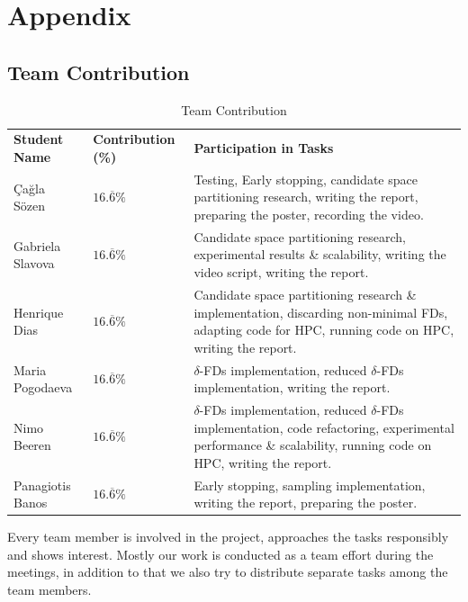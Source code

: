 \documentclass{article}
\begin{document}
\clearpage
\appendix
\section{Appendix}\label{appendix}
    \subsection{Team Contribution}
     
    \begin{table}[ht]
    \centering
        \begin{tabular}{|p{}|p{}|p{}|}
        \hline
        \textbf{Student Name} & \textbf{Contribution (\%)} & \textbf{Participation in Tasks} \\
        \Xhline{2\arrayrulewidth}
        
        Çağla Sözen & $16.\overline{6}\%$ & Testing, Early stopping, candidate space partitioning research,  writing the report, preparing the poster, recording the video.\\
        \hline
        
        Gabriela Slavova & $16.\overline{6}\%$ & Candidate space partitioning research, experimental results \& scalability, writing the video script, writing the report.\\
        \hline
        
        Henrique Dias & $16.\overline{6}\%$ & Candidate space partitioning research \& implementation, discarding non-minimal FDs, adapting code for HPC, running code on HPC, writing the report.\\
        \hline
        
        Maria Pogodaeva & $16.\overline{6}\%$ & $\delta$-FDs implementation, reduced $\delta$-FDs implementation, writing the report.\\
        \hline
        
        Nimo Beeren & $16.\overline{6}\%$ & $\delta$-FDs implementation, reduced $\delta$-FDs implementation, code refactoring, experimental performance \& scalability, running code on HPC, writing the report. \\
        \hline
        
        Panagiotis Banos & $16.\overline{6}\%$ & Early stopping, sampling implementation, writing the report, preparing the poster. \\
        \hline
        
        \end{tabular}
        \caption{Team Contribution}
        \label{tab:contribution}
    \end{table}
    
    Every team member is involved in the project, approaches the tasks responsibly and shows interest. Mostly our work is conducted as a team effort during the meetings, in addition to that we also try to distribute separate tasks among the team members.
    
    
\newpage


% 

\end{document}
